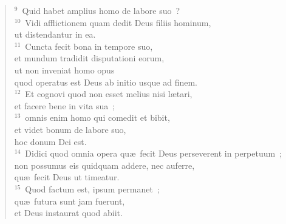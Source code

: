 \begin{flushleft}\begin{verse}${}^{9}$~Quid habet amplius homo de labore suo~?\\
${}^{10}$~Vidi afflictionem quam dedit Deus filiis hominum,\\ ut distendantur in ea.\\
${}^{11}$~Cuncta fecit bona in tempore suo,\\ et mundum tradidit disputationi eorum,\\ ut non inveniat homo opus\\ quod operatus est Deus ab initio usque ad finem.\\
${}^{12}$~Et cognovi quod non esset melius nisi l\ae tari,\\ et facere bene in vita sua~;\\
${}^{13}$~omnis enim homo qui comedit et bibit,\\ et videt bonum de labore suo,\\ hoc donum Dei est.\\
${}^{14}$~Didici quod omnia opera qu\ae\ fecit Deus perseverent in perpetuum~;\\ non possumus eis quidquam addere, nec auferre,\\ qu\ae\ fecit Deus ut timeatur.\\
${}^{15}$~Quod factum est, ipsum permanet~;\\ qu\ae\ futura sunt jam fuerunt,\\ et Deus instaurat quod abiit.\end{verse}\end{flushleft}


